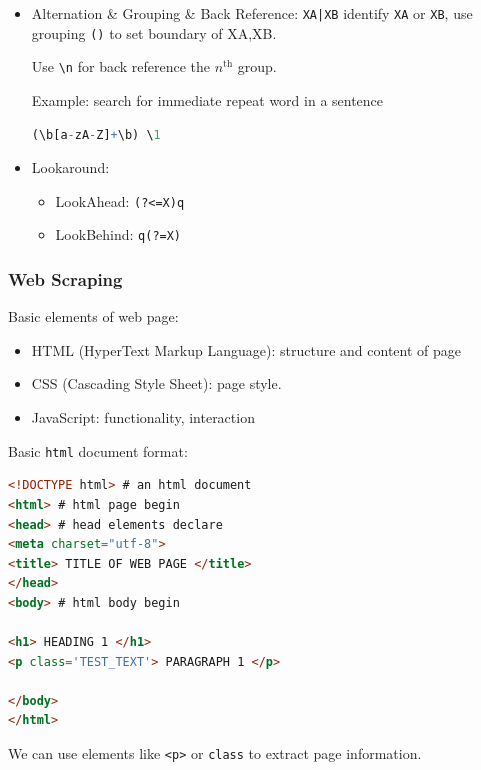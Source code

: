 \begin{itemize}[topsep=2pt,itemsep=0pt]
        
    \item Alternation \& Grouping \& Back Reference: \lstinline!XA|XB! identify \lstinline|XA| or \lstinline|XB|, use grouping \lstinline|()| to set boundary of XA,XB.
    
    Use \lstinline|\n| for back reference the $ n^\mathrm{th}  $ group. 
\begin{rcode}
    Example: search for immediate repeat word in a sentence
\begin{lstlisting}[language=R]
(\b[a-zA-Z]+\b) \1
\end{lstlisting}
\end{rcode}
    \item Lookaround: 
    \begin{itemize}[topsep=2pt,itemsep=0pt]
        \item LookAhead: \lstinline|(?<=X)q|
        \item LookBehind: \lstinline|q(?=X)|
    \end{itemize}
    
        
\end{itemize}

    
\subsubsection{Web Scraping}
    Basic elements of web page:
\begin{itemize}[topsep=2pt,itemsep=0pt]
    \item HTML (HyperText Markup Language): structure and content of page
    \item CSS (Cascading Style Sheet): page style.
    \item JavaScript: functionality, interaction
\end{itemize}

        
Basic \lstinline|html| document format:

\begin{rcode}
\begin{lstlisting}[language=HTML]
<!DOCTYPE html> # an html document
<html> # html page begin
<head> # head elements declare
<meta charset="utf-8">
<title> TITLE OF WEB PAGE </title>
</head>
<body> # html body begin
 
<h1> HEADING 1 </h1>
<p class='TEST_TEXT'> PARAGRAPH 1 </p>
 
</body>
</html>
\end{lstlisting}
\end{rcode}

    We can use elements like \lstinline|<p>| or \lstinline|class| to extract page information.

